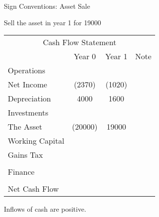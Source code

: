 \documentclass[ignorenonframetext,]{beamer}
\begin{document}
\begin{frame}{Sign Conventions: Asset Sale}

Sell the asset in year 1 for 19000

\begin{table}
\begin{tabular}{l||c|c||p{3cm}}
        \multicolumn{4}{c}{Cash Flow Statement}\\
  &Year 0  &Year 1  &Note\\        
    Operations& &   &\\
    \hspace{.25in}Net Income    &   (2370)& (1020)&\\
    \hspace{.25in}Depreciation  &   4000&   1600&\\
    Investments &   &   &\\
\hspace{.25in}The Asset         &(20000)    &   19000&\\
\hspace{.25in}Working Capital   &   &   &\\
        \hspace{.25in}Gains Tax &   &   &\\
            &   &   &\\
        
    Finance &   &   &\\
            &   &   &\\
        \hline
        Net Cash Flow   &   &   &\\
\end{tabular}
\end{table}

Inflows of cash are positive.

\end{frame}
\end{document}
